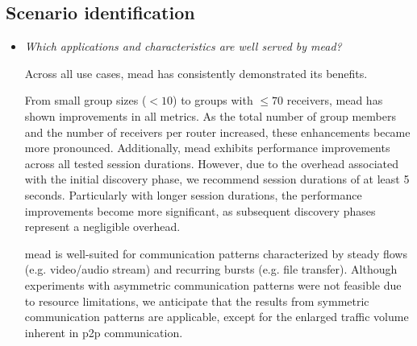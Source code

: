 \subsection{Scenario identification} %
\label{sub:discussion_scenario}
\begin{itemize}
\item[\textit{\rqiii{}}]
    \textit{Which applications and characteristics are well served by \gls{mead}?}

    Across all use cases, \gls{mead} has consistently demonstrated its
        benefits.

    From small group sizes ($<10$) to groups with $\leq 70$ receivers, \gls{mead}
        has shown improvements in all metrics.
    As the total number of group members and the number of receivers per
        router increased, these enhancements became more pronounced.
    Additionally, \gls{mead} exhibits performance improvements across all tested
        session durations.
    However, due to the overhead associated with the initial discovery phase,
        we recommend session durations of at least 5 seconds.
    Particularly with longer session durations, the performance improvements
        become more significant, as subsequent discovery phases represent a
        negligible overhead.

    \gls{mead} is well-suited for communication patterns characterized by steady
        flows (e.g. video/audio stream) and recurring bursts (e.g. file
        transfer).
    Although experiments with asymmetric communication patterns were not
        feasible due to resource limitations, we anticipate that the results
        from symmetric communication patterns are applicable, except for the
        enlarged traffic volume inherent in \gls{p2p} communication.


\end{itemize}

